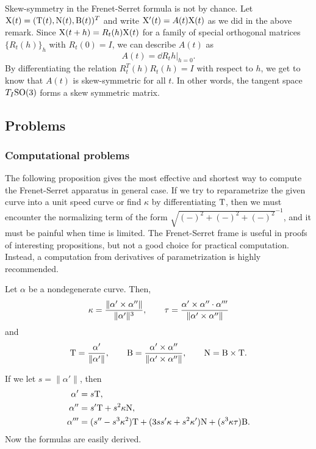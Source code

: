 \documentclass{../exp}
\def\a{\alpha}
\begin{document}
\begin{rmk}
Skew-symmetry in the Frenet-Serret formula is not by chance.
Let $\mathrm{X}(t)=(\mathrm{T}(t),\mathrm{N}(t),\mathrm{B}(t))^T$ and write $\mathrm{X}'(t)=A(t)\mathrm{X}(t)$ as we did in the above remark.
Since $\mathrm{X}(t+h)=R_t(h)\mathrm{X}(t)$ for a family of special orthogonal matrices $\{R_t(h)\}_h$ with $R_t(0)=I$, we can describe $A(t)$ as 
\[A(t)=\left.\dd{R_t}{h}\right\rvert_{h=0}.\]
By differentiating the relation $R_t^T(h)R_t(h)=I$ with respect to $h$, we get to know that $A(t)$ is skew-symmetric for all $t$.
In other words, the tangent space $T_I\mathrm{SO}(3)$ forms a skew symmetric matrix.
\end{rmk}











\subsection{Problems}



\subsubsection{Computational problems}

The following proposition gives the most effective and shortest way to compute the Frenet-Serret apparatus in general case.
If we try to reparametrize the given curve into a unit speed curve or find $\kappa$ by differentiating $\mathrm{T}$, then we must encounter the normalizing term of the form $\sqrt{(-)^2+(-)^2+(-)^2}^{-1}$, and it must be painful when time is limited.
The Frenet-Serret frame is useful in proofs of interesting propositions, but not a good choice for practical computation.
Instead, a computation from derivatives of parametrization is highly recommended.
\begin{prop}
Let $\a$ be a nondegenerate curve.
Then,
\[\kappa=\frac{\|\a'\x\a''\|}{\|\a'\|^3},\qquad\tau=\frac{\a'\x\a''\cdot\a'''}{\|\a'\x\a''\|}\]
and
\[\rT=\frac{\a'}{\|\a'\|},\qquad\rB=\frac{\a'\x\a''}{\|\a'\x\a''\|},\qquad\rN=\rB\x\rT.\]
\end{prop}
\begin{pf}
If we let $s=\|\a'\|$, then
\begin{align*}
\a'&=s\rT,\\
\a''&=s'\rT+s^2\kappa\rN,\\
\a'''&=(s''-s^3\kappa^2)\rT+(3ss'\kappa+s^2\kappa')\rN+(s^3\kappa\tau)\rB.
\end{align*}
Now the formulas are easily derived.
\end{pf}
\end{document}
